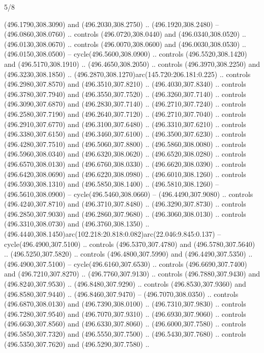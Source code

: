 \begin{flagdescription}{5/8}
\begin{scope}[xshift=0.5\flaglength,yshift=0.5\flagwidth,scale=\flagwidth/475.63]
\begin{scope}[y=0.8pt, x=0.8pt, yscale=-1, xscale=1,shift={(-450,-300)}]
\begin{scope}[cm={{1.0,0.0,0.0,1.0,(-0.0002,0.12556)}},cm={{1.0,0.0,0.0,1.0,(0.00179,0.0)}}]
\begin{scope}[cm={{1.11592,0.0,0.0,1.11592,(-106.89933,-41.77764)}}]
\begin{scope}[draw=black,fill=cfff]
\begin{scope}[fill=black]
  (496.1790,308.3090) and (496.2030,308.2750) .. (496.1920,308.2480) --
  (496.0860,308.0760) .. controls (496.0720,308.0440) and (496.0340,308.0520) ..
  (496.0130,308.0670) .. controls (496.0070,308.0600) and (496.0030,308.0530) ..
  (496.0150,308.0500) -- cycle(496.5600,308.0900) .. controls
  (496.5520,308.1420) and (496.5170,308.1910) .. (496.4650,308.2050) .. controls
  (496.3970,308.2250) and (496.3230,308.1850) ..
  (496.2870,308.1270)arc(145.720:206.181:0.225) .. controls (496.2980,307.8570)
  and (496.3510,307.8210) .. (496.4030,307.8340) .. controls (496.3780,307.7940)
  and (496.3550,307.7520) .. (496.3260,307.7140) .. controls (496.3090,307.6870)
  and (496.2830,307.7140) .. (496.2710,307.7240) .. controls (496.2580,307.7190)
  and (496.2640,307.7120) .. (496.2710,307.7040) .. controls (496.2910,307.6770)
  and (496.3100,307.6480) .. (496.3310,307.6210) .. controls (496.3380,307.6150)
  and (496.3460,307.6100) .. (496.3500,307.6230) .. controls (496.4280,307.7510)
  and (496.5060,307.8800) .. (496.5860,308.0080) .. controls (496.5960,308.0340)
  and (496.6320,308.0620) .. (496.6520,308.0280) .. controls (496.6570,308.0130)
  and (496.6760,308.0330) .. (496.6620,308.0390) .. controls (496.6420,308.0690)
  and (496.6220,308.0980) .. (496.6010,308.1260) .. controls (496.5930,308.1310)
  and (496.5850,308.1400) .. (496.5810,308.1260) -- (496.5610,308.0900) --
  cycle(496.5460,308.0660) -- (496.4490,307.9080) .. controls
  (496.4240,307.8710) and (496.3710,307.8480) .. (496.3290,307.8730) .. controls
  (496.2850,307.9030) and (496.2860,307.9680) .. (496.3060,308.0130) .. controls
  (496.3310,308.0730) and (496.3760,308.1350) ..
  (496.4440,308.1450)arc(102.218:20.818:0.082)arc(22.046:9.845:0.137) --
  cycle(496.4900,307.5100) .. controls (496.5370,307.4780) and
  (496.5780,307.5640) .. (496.5250,307.5820) .. controls (496.4800,307.5990) and
  (496.4490,307.5350) .. (496.4900,307.5100) -- cycle(496.6160,307.6530) ..
  controls (496.6690,307.7400) and (496.7210,307.8270) .. (496.7760,307.9130) ..
  controls (496.7880,307.9430) and (496.8240,307.9530) .. (496.8480,307.9290) ..
  controls (496.8530,307.9360) and (496.8580,307.9440) .. (496.8460,307.9470) --
  (496.7070,308.0350) .. controls (496.6870,308.0130) and (496.7390,308.0100) ..
  (496.7310,307.9830) .. controls (496.7280,307.9540) and (496.7070,307.9310) ..
  (496.6930,307.9060) .. controls (496.6630,307.8560) and (496.6330,307.8060) ..
  (496.6000,307.7580) .. controls (496.5850,307.7320) and (496.5550,307.7500) ..
  (496.5430,307.7680) .. controls (496.5350,307.7620) and (496.5290,307.7580) ..

\end{scope}
\end{scope}
\end{scope}
\end{scope}
\end{scope}
\end{scope}
\end{flagdescription}
